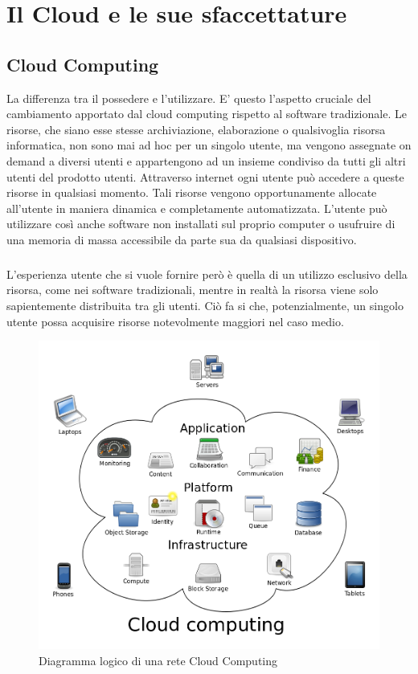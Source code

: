 \chapter{Il Cloud e le sue sfaccettature}

\section{Cloud Computing}
La differenza tra il possedere e l'utilizzare. E' questo l'aspetto cruciale del cambiamento apportato dal cloud computing rispetto al software tradizionale. Le risorse, che siano esse stesse archiviazione, elaborazione o qualsivoglia risorsa informatica, non sono mai ad hoc per un singolo utente, ma vengono assegnate on demand a diversi utenti e appartengono ad un insieme condiviso da tutti gli altri utenti del prodotto utenti. Attraverso internet ogni utente può accedere a queste risorse in qualsiasi momento. Tali risorse vengono opportunamente allocate all'utente in maniera dinamica e completamente automatizzata. L'utente può utilizzare così anche software non installati sul proprio computer o usufruire di una memoria di massa accessibile da parte sua da qualsiasi dispositivo.
\paragraph{}
L'esperienza utente che si vuole fornire però è quella di un utilizzo esclusivo della risorsa, come nei software tradizionali, mentre in realtà la risorsa viene solo sapientemente distribuita tra gli utenti. Ciò fa si che, potenzialmente, un singolo utente possa acquisire risorse notevolmente maggiori nel caso medio.
\begin{figure}
	\centering
	\includegraphics[width=0.7\linewidth]{capitoli/imgs/CloudComputing}
	\caption{Diagramma logico di una rete Cloud Computing}
	\label{fig:cloudcomputing}
\end{figure}
